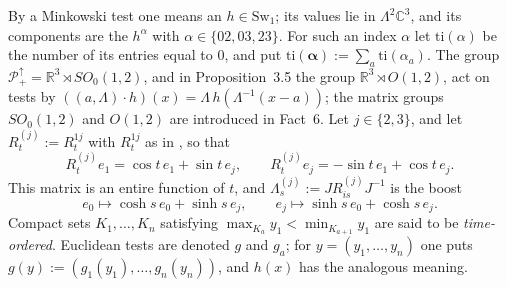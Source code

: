 \documentclass[11pt,letterpaper,reqno]{amsart}
\theoremstyle{definition}
\begin{document}
By a Minkowski test one means an $h\in\mathrm{Sw}_1$; its values lie in $\Lambda^2\mathbb C^3$, and its components are the $h^\alpha$ with $\alpha\in\{02,03,23\}$.
For such an index $\alpha$ let $\mathrm{ti}(\alpha)$ be the number of its entries equal to $0$, and put $\mathrm{ti}(\boldsymbol\alpha):=\sum_a\mathrm{ti}(\alpha_a)$.
The group $\mathcal P_+^\uparrow=\mathbb R^3\rtimes SO_0(1,2)$, and in Proposition~3.5 the group $\mathbb R^3\rtimes O(1,2)$, act on tests by $((a,\Lambda)\cdot h)(x)=\Lambda\,h(\Lambda^{-1}(x-a))$; the matrix groups $SO_0(1,2)$ and $O(1,2)$ are introduced in Fact~6.
Let $j\in\{2,3\}$, and let $R^{(j)}_t:=R^{1j}_t$ with $R^{1j}_t$ as in \cite[Definition~14.1]{QEDII}, so that
\begin{equation*}
R^{(j)}_te_1=\cos t\,e_1+\sin t\,e_j,\qquad R^{(j)}_te_j=-\sin t\,e_1+\cos t\,e_j.
\end{equation*}
This matrix is an entire function of $t$, and $\Lambda^{(j)}_s:=JR^{(j)}_{is}J^{-1}$ is the boost
\begin{equation*}
e_0\mapsto\cosh s\,e_0+\sinh s\,e_j,\qquad e_j\mapsto\sinh s\,e_0+\cosh s\,e_j.
\end{equation*}
Compact sets $K_1,\dots,K_n$ satisfying $\max_{K_a}y_1<\min_{K_{a+1}}y_1$ are said to be \emph{time-ordered}.
Euclidean tests are denoted $g$ and $g_a$; for $y=(y_1,\dots,y_n)$ one puts $g(y):=(g_1(y_1),\dots,g_n(y_n))$, and $h(x)$ has the analogous meaning.
\end{document}
